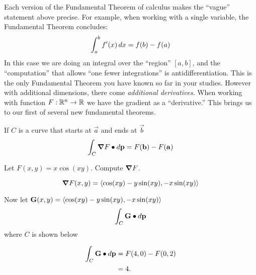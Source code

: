 \documentclass{ximera}
\begin{document}
Each version of the Fundamental Theorem of calculus makes the
``vague'' statement above precise. For example, when working with a
single variable, the Fundamental Theorem concludes:
\[
\int_a^b f'(x) \mathop{}\!d x = f(b) - f(a)
\]
In this case we are doing an integral over the ``region'' $[a,b]$, and
the ``computation'' that allows ``one fewer integrations'' is
antidifferentiation. This is the only Fundamental Theorem you have
known so far in your studies.  However with additional dimensions,
there come \textit{additional derivatives}. When working with function
$F:\mathbb R^n\to\mathbb R$ we have the gradient as a ``derivative.'' This brings us
to our first of several new fundamental theorems.

\begin{theorem}
  If $C$ is a curve that starts at $\vec{a}$ and ends at $\vec{b}$
  \[
  \int_C \boldsymbol\nabla F\bullet \mathop{}\!d \mathbf{p} = F(\mathbf{b}) - F(\mathbf{a})
  \]
\end{theorem}

\begin{question}
  Let $F(x,y) = x\cos(xy)$. Compute $\boldsymbol\nabla F$.
  \begin{prompt}
  \[
  \boldsymbol\nabla F(x,y) = \left\langle \cos(xy) -y\sin(xy), -x\sin(xy)\right\rangle
  \]
  \end{prompt}
  \begin{question}
    Now let $\mathbf{G}(x,y) = \left\langle \cos(xy) -y\sin(xy), -x\sin(xy)\right\rangle$
    \[
    \int_C \mathbf G \bullet \mathop{}\!d \mathbf{p}
    \]
    where $C$ is shown below
      \begin{image}
      \end{image}
      \begin{prompt}
        \begin{align*}
          \int_C \mathbf{G}\bullet \mathop{}\!d \mathbf{p} &= F(4,0) - F(0,2)\\
          &= 4.
        \end{align*}
      \end{prompt}
  \end{question}
\end{question}
\end{document}
